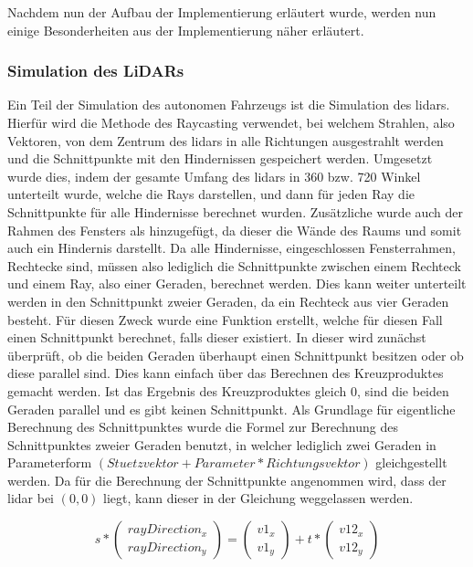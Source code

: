 Nachdem nun der Aufbau der Implementierung erläutert wurde, werden nun einige Besonderheiten aus der Implementierung näher erläutert. 

\subsubsection{Simulation des LiDARs}

Ein Teil der Simulation des autonomen Fahrzeugs ist die Simulation des \ac{lidar}s. Hierfür wird die Methode des Raycasting verwendet, bei welchem Strahlen, also Vektoren, von dem Zentrum des \ac{lidar}s in alle Richtungen ausgestrahlt werden und die Schnittpunkte mit den Hindernissen gespeichert werden. Umgesetzt wurde dies, indem der gesamte Umfang des \ac{lidar}s in 360 bzw. 720 Winkel unterteilt wurde, welche die Rays darstellen, und dann für jeden Ray die Schnittpunkte für alle Hindernisse berechnet wurden. Zusätzliche wurde auch der Rahmen des Fensters als hinzugefügt, da dieser die Wände des Raums und somit auch ein Hindernis darstellt. Da alle Hindernisse, eingeschlossen Fensterrahmen, Rechtecke sind, müssen also lediglich die Schnittpunkte zwischen einem Rechteck und einem Ray, also einer Geraden, berechnet werden. Dies kann weiter unterteilt werden in den Schnittpunkt zweier Geraden, da ein Rechteck aus vier Geraden besteht. Für diesen Zweck wurde eine Funktion erstellt, welche für diesen Fall einen Schnittpunkt berechnet, falls dieser existiert. In dieser wird zunächst überprüft, ob die beiden Geraden überhaupt einen Schnittpunkt besitzen oder ob diese parallel sind. Dies kann einfach über das Berechnen des Kreuzproduktes gemacht werden. Ist das Ergebnis des Kreuzproduktes gleich \(0\), sind die beiden Geraden parallel und es gibt keinen Schnittpunkt. Als Grundlage für eigentliche Berechnung des Schnittpunktes wurde die Formel zur Berechnung des Schnittpunktes zweier Geraden benutzt, in welcher lediglich zwei Geraden in Parameterform \((Stuetzvektor + Parameter * Richtungsvektor)\) gleichgestellt werden. Da für die Berechnung der Schnittpunkte angenommen wird, dass der \ac{lidar} bei \((0, 0)\) liegt, kann dieser in der Gleichung weggelassen werden. 

\[
s * 
\begin{pmatrix}
    rayDirection_x \\ 
    rayDirection_y
\end{pmatrix}
= 
\begin{pmatrix}
    v1_x \\ 
    v1_y
\end{pmatrix}
+ t * 
\begin{pmatrix}
    v12_x \\ 
    v12_y
\end{pmatrix}
\]

